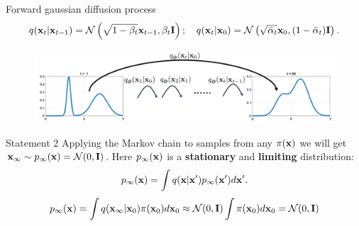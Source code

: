 \begin{frame}{Forward gaussian diffusion process}
	\vspace{-0.7cm}
	{\small
	\[
		q(\mathbf{x}_t | \mathbf{x}_{t-1}) = \mathcal{N}\left(\sqrt{1 - \beta_t} \mathbf{x}_{t-1}, \beta_t \mathbf{I}\right); \quad q(\mathbf{x}_t | \mathbf{x}_0) = \mathcal{N}\left(\sqrt{\bar{\alpha}_t} \mathbf{x}_0, (1 - \bar{\alpha}_t) \mathbf{I}\right).
	\]
	}
	\vspace{-0.8cm}
	\begin{figure}
		\includegraphics[width=0.8\linewidth]{figs/conditional_diffusion}
	\end{figure}
	\vspace{-0.5cm}
	\begin{block}{Statement 2}
		Applying the Markov chain to samples from any $\pi(\mathbf{x})$ we will get $\mathbf{x}_{\infty} \sim p_{\infty}(\mathbf{x}) = \mathcal{N}(0, \mathbf{I})$. Here $p_{\infty}(\mathbf{x})$ is a \textbf{stationary} and \textbf{limiting} distribution:
		\[
			p_{\infty}(\mathbf{x}) = \int q(\mathbf{x} | \mathbf{x}') p_{\infty}(\mathbf{x}') d \mathbf{x}'. 
		\]
		\[
			p_{\infty}(\mathbf{x}) = \int q(\mathbf{x}_{\infty} | \mathbf{x}_0) \pi(\mathbf{x}_0) d\mathbf{x}_0 \approx \mathcal{N}(0, \mathbf{I}) \int \pi(\mathbf{x}_0) d\mathbf{x}_0 = \mathcal{N}(0, \mathbf{I})
		\]
		\vspace{-0.8cm}
	\end{block}
 \end{frame}
